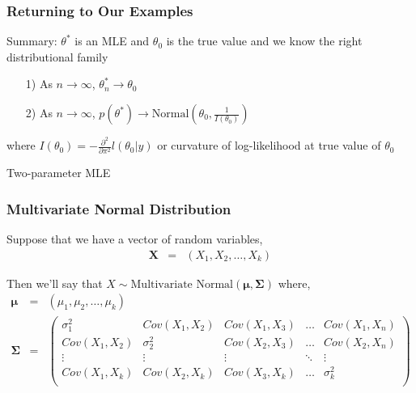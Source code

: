 \documentclass{beamer}
\begin{document}
\begin{frame}
\frametitle{Returning to Our Examples}


Summary: $\theta^{*}$ is an MLE and $\theta_{0}$ is the true value and we know the right distributional family
\begin{itemize}
\item[1)] As $n \rightarrow \infty$,  $\theta^{*}_{n} \rightarrow \theta_{0}$
\item[2)] As $n \rightarrow \infty$, $p(\theta^{*}) \rightarrow \text{Normal}(\theta_{0}, \frac{1}{I(\theta_{0})})$
\end{itemize}
where $I(\theta_{0} ) =  - \frac{\partial^2}{\partial \pi^2} l(\theta_{0}|y) $ or curvature of log-likelihood at true value of $\theta_{0}$

\end{frame}

\begin{frame}
\huge
Two-parameter MLE


\end{frame}



\begin{frame}
\frametitle{Multivariate Normal Distribution}

Suppose that we have a vector of random variables,
\begin{eqnarray}
\boldsymbol{X} & = & (X_{1}, X_{2}, \hdots, X_{k} ) \nonumber
\end{eqnarray}

Then we'll say that $X \sim \text{Multivariate Normal} (\boldsymbol{\mu}, \boldsymbol{\Sigma})$ where,
\begin{eqnarray}
\boldsymbol{\mu} & = & (\mu_{1}, \mu_{2}, \hdots, \mu_{k}) \nonumber \\
\boldsymbol{\Sigma} & = & \begin{pmatrix}
\sigma^2_{1} &  Cov(X_{1}, X_{2} ) & Cov(X_{1}, X_{3} ) & \hdots & Cov(X_{1}, X_{n} ) \\
Cov(X_{1}, X_{2}) & \sigma^2_{2} & Cov(X_{2}, X_{3} ) & \hdots & Cov(X_{2} , X_{n} ) \\
\vdots & \vdots & \vdots  &\ddots & \vdots \\
Cov(X_{1}, X_{k}) & Cov(X_{2}, X_{k} ) & Cov(X_{3}, X_{k} ) & \hdots & \sigma^2_{k} \\
\end{pmatrix} \nonumber
\end{eqnarray}


\end{frame}
\end{document}
